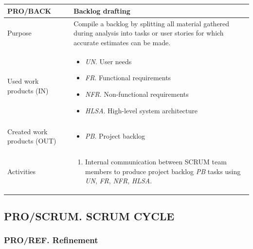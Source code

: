 \subsection{} %
\begin{table}[h!]
\begin{tabular}{l|p{}}
\hline
\textbf{PRO/BACK}        & \textbf{Backlog drafting} \\ \hline
Purpose & Compile a backlog by splitting all material gathered during analysis into tasks or user stories for which accurate estimates can be made.  \\ \hline
Used work products (IN)&      
\begin{itemize}
    \item \textit{UN}. User needs
    \item \textit{FR}. Functional requirements
    \item \textit{NFR}. Non-functional requirements
    \item \textit{HLSA}. High-level system architecture 
\end{itemize}
\\ \hline
Created work products (OUT)&     
\begin{itemize}
    \item \textit{PB}. Project backlog
\end{itemize}
\\ \hline
Activities            &   
\begin{enumerate}
    \item Internal communication between SCRUM team members to produce project backlog \textit{PB} tasks using \textit{UN}, \textit{FR}, \textit{NFR}, \textit{HLSA}.
\end{enumerate}
\\ \hline
\end{tabular}

\label{pro/back}
\end{table}

\newpage
\subsection{PRO/SCRUM. SCRUM CYCLE }

\subsubsection{PRO/REF. Refinement }

